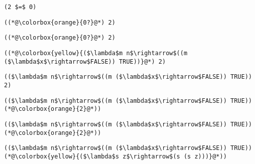 \documentclass{beamer}
\begin{document}
\begin{frame}[fragile]{\CurrentSection}
\lstset{basicstyle=\ttfamily\small}\lstset{numbers=none}\lstset{language=ML}\begin{lstlisting}
(2 $=$ 0)
\end{lstlisting}
\pause\lstset{language=ML}\begin{lstlisting}
((*@\colorbox{orange}{0?}@*) 2)
\end{lstlisting}

\end{frame}

\begin{frame}[fragile]{\CurrentSection}
\lstset{basicstyle=\ttfamily\small}\lstset{numbers=none}\lstset{language=ML}\begin{lstlisting}
((*@\colorbox{orange}{0?}@*) 2)
\end{lstlisting}
\pause\lstset{language=ML}\begin{lstlisting}
((*@\colorbox{yellow}{($\lambda$m n$\rightarrow$((m ($\lambda$x$\rightarrow$FALSE)) TRUE))}@*) 2)
\end{lstlisting}

\end{frame}

\begin{frame}[fragile]{\CurrentSection}
\lstset{basicstyle=\ttfamily\small}\lstset{numbers=none}\lstset{language=ML}\begin{lstlisting}
(($\lambda$m n$\rightarrow$((m ($\lambda$x$\rightarrow$FALSE)) TRUE)) 2)
\end{lstlisting}
\pause\lstset{language=ML}\begin{lstlisting}
(($\lambda$m n$\rightarrow$((m ($\lambda$x$\rightarrow$FALSE)) TRUE)) (*@\colorbox{orange}{2}@*))
\end{lstlisting}

\end{frame}

\begin{frame}[fragile]{\CurrentSection}
\lstset{basicstyle=\ttfamily\small}\lstset{numbers=none}\lstset{language=ML}\begin{lstlisting}
(($\lambda$m n$\rightarrow$((m ($\lambda$x$\rightarrow$FALSE)) TRUE)) (*@\colorbox{orange}{2}@*))
\end{lstlisting}
\pause\lstset{language=ML}\begin{lstlisting}
(($\lambda$m n$\rightarrow$((m ($\lambda$x$\rightarrow$FALSE)) TRUE)) (*@\colorbox{yellow}{($\lambda$s z$\rightarrow$(s (s z)))}@*))
\end{lstlisting}

\end{frame}
\end{document}
